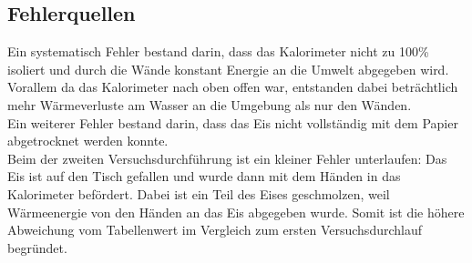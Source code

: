 \documentclass[a4paper,12pt]{article}
\begin{document}
\subsection{Fehlerquellen}

Ein systematisch Fehler bestand darin, dass das Kalorimeter nicht zu 100\% isoliert und durch die Wände konstant Energie an die Umwelt abgegeben wird. Vorallem da das Kalorimeter nach oben offen war, entstanden dabei beträchtlich mehr Wärmeverluste am Wasser an die Umgebung als nur den Wänden.\\

Ein weiterer Fehler bestand darin, dass das Eis nicht vollständig mit dem Papier abgetrocknet werden konnte.\\

Beim der zweiten Versuchsdurchführung ist ein kleiner Fehler unterlaufen: Das Eis ist auf den Tisch gefallen und wurde dann mit dem Händen in das Kalorimeter befördert. Dabei ist ein Teil des Eises geschmolzen, weil Wärmeenergie von den Händen an das Eis abgegeben wurde. Somit ist die höhere Abweichung vom Tabellenwert im Vergleich zum ersten Versuchsdurchlauf begründet.
\end{document}
